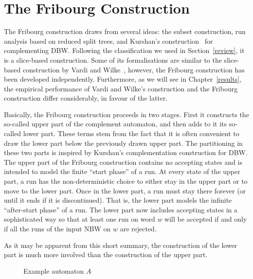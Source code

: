 \chapter{The Fribourg Construction}
\label{fribourg_construction}
The Fribourg construction draws from several ideas: the subset construction, run analysis based on reduced split trees, and Kurshan's construction~\cite{Kurshan198759} for complementing DBW. Following the classification we used in Section~\ref{review}, it is a slice-based construction. Some of its formalisations are similar to the slice-based construction by Vardi and Wilke~\cite{vardi2007automata}, however, the Fribourg construction has been developed independently. Furthermore, as we will see in Chapter~\ref{results}, the empirical performance of Vardi and Wilke's construction and the Fribourg construction differ considerably, in favour of the latter.

Basically, the Fribourg construction proceeds in two stages. First it constructs the so-called upper part of the complement automaton, and then adds to it its so-called lower part. These terms stem from the fact that it is often convenient to draw the lower part below the previously drawn upper part. The partitioning in these two parts is inspired by Kurshan's complementation construction for DBW. The upper part of the Fribourg construction contains no accepting states and is intended to model the finite ``start phase'' of a run. At every state of the upper part, a run has the non-deterministic choice to either stay in the upper part or to move to the lower part. Once in the lower part, a run must stay there forever (or until it ends if it is discontinued). That is, the lower part models the infinite ``after-start phase'' of a run. The lower part now includes accepting states in a sophisticated way so that at least one run on word $w$ will be accepted if and only if all the runs of the input NBW on $w$ are rejected.

As it may be apparent from this short summary, the construction of the lower part is much more involved than the construction of the upper part.

\begin{figure}
\begin{center}
\Automaton
\caption{Example automaton $A$}
\label{example_automaton}
\end{center}
\end{figure} 


